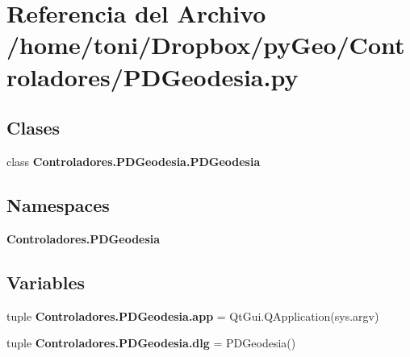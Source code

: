 \section{Referencia del Archivo /home/toni/\-Dropbox/py\-Geo/\-Controladores/\-P\-D\-Geodesia.py}
\label{Controladores_2PDGeodesia_8py}
\subsection*{Clases}
\begin{DoxyCompactItemize}
\item 
class {\bf Controladores.\-P\-D\-Geodesia.\-P\-D\-Geodesia}
\end{DoxyCompactItemize}
\subsection*{Namespaces}
\begin{DoxyCompactItemize}
\item 
{\bf Controladores.\-P\-D\-Geodesia}
\end{DoxyCompactItemize}
\subsection*{Variables}
\begin{DoxyCompactItemize}
\item 
tuple {\bf Controladores.\-P\-D\-Geodesia.\-app} = Qt\-Gui.\-Q\-Application(sys.\-argv)
\item 
tuple {\bf Controladores.\-P\-D\-Geodesia.\-dlg} = P\-D\-Geodesia()
\end{DoxyCompactItemize}
